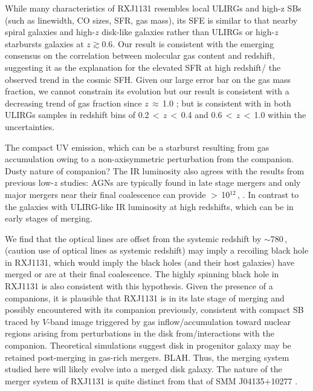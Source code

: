 \documentclass[]{emulateapj}
\begin{document}
While many characteristics of RXJ1131 resembles local ULIRGs and high-z SBs (such as 
linewidth, CO sizes, SFR, gas mass), its SFE is similar to that nearby 
spiral galaxies and high-$z$ disk-like galaxies rather than 
ULIRGs or high-$z$ starbursts galaxies at $z$$\gtrsim$0.6. 
Our result is consistent with the emerging consensus on
the correlation between molecular gas content and redshift,
suggesting it as the explanation for the elevated SFR at high redshift/
the observed trend in the cosmic SFH.
Given our large error bar on the gas mass fraction, we cannot constrain its evolution 
but our result is consistent with a decreasing trend of gas fraction
since $z$\,$\approx$\,1.0 \citep{Combes13a}; but is consistent with 
in both ULIRGs samples in redshift bins of 0.2\,$<$\,$z$\,$<$\,0.4 and 0.6\,$<$\,$z$\,$<$\,1.0 within the uncertainties.

The compact UV emission, which can be a starburst resulting from gas accumulation
owing to a non-axisymmetric perturbation from the companion.
Dusty nature of companion?
The IR luminosity also agrees with the results from previous low-$z$ studies: AGNs are
typically found in late stage mergers \citep{Yuan10a,Iwasawa11a,Carpineti12a} and
only major mergers near their final coalescence can provide \LIR$>$\,10$^{12}$\,\Lsun,
\citep[\eg][]{Carpineti15a,Larson16a}. In contrast to the 
galaxies with ULIRG-like IR luminosity at high redshifts, which can be in early stages of merging.

We find that the optical lines are offset from the systemic redshift by $\sim$780\,\kms, (caution use of optical lines 
as systemic redshift)
may imply a recoiling black hole in RXJ1131, which would imply the black
holes (and their host galaxies) have merged or are at their final coalescence.
The highly spinning black hole in RXJ1131 is also consistent with
this hypothesis.
Given the presence of a companions, it is plausible that RXJ1131 is in its late stage of merging and 
possibly encountered with its companion previously, consistent with 
compact SB traced by $V$-band image triggered by gas inflow/accumulation toward nuclear regions 
arising from perturbations in the disk from/interactions with the companion.
Theoretical simulations suggest disk in progenitor galaxy may be retained post-merging in gas-rich 
mergers. BLAH. Thus, the merging system studied here will likely evolve into a merged disk galaxy.
The nature of the merger system of RXJ1131 is quite distinct from that of SMM J04135$+$10277 \citep[hereafter J04135][]{Riechers13a}.
\end{document}
